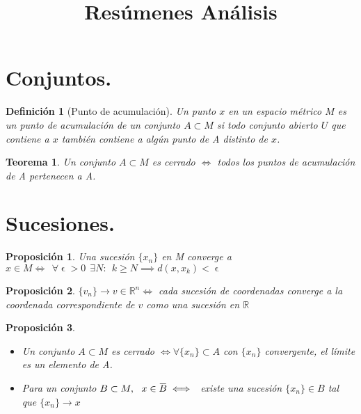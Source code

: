 \documentclass[11pt, a4paper]{article}
\title{\textbf{Resúmenes Análisis}}
\date{}
\let\epsilon\upvarepsilon
\newcommand{\overbar}[1]{\mkern 1.5mu\overline{\mkern-1.5mu#1\mkern-1.5mu}\mkern 1.5mu}
\theoremstyle{theorem-style}
\newtheorem*{nth}{Teorema}
\newtheorem*{nprop}{Proposición}
\theoremstyle{definition-style}
\newtheorem*{ndef}{Definición}
\theoremstyle{remark-style}
\theoremstyle{example-style}
\begin{document}
\maketitle

\section{Conjuntos.}
\begin{ndef}[Punto de acumulación]

Un punto $x$ en un espacio métrico $M$ es un punto de acumulación de un conjunto $A\subset M$ si todo conjunto abierto $U$ que contiene a $x$ también contiene a algún punto de A distinto de $x$.
	
\end{ndef}

\begin{nth}
	Un conjunto $A\subset M$ es cerrado $\iff$ todos los puntos de acumulación de A pertenecen a A.
\end{nth}
\section{Sucesiones.}

\begin{nprop}
	Una sucesión $\{x_n\}$ en M converge a $x \in M \iff \ \ \forall \epsilon > 0 \ \ \exists N : \ \ k \geq N \implies d(x,x_k) < \epsilon$
	
	
\end{nprop}

\begin{nprop}
	$\{v_n\} \to v \in \mathbb{R}^n \iff$ cada sucesión de coordenadas converge a la coordenada correspondiente de $v$ como una sucesión en $\mathbb{R}$
\end{nprop}

\begin{nprop}\hfill\\
	\begin{itemize}
	\item Un conjunto $A\subset M$ es cerrado $\iff \forall \{x_n\} \subset A $ con $\{x_n\}$ convergente, el límite es un elemento de A.
	
	\item Para un conjunto $B \subset M, \ \ x \in \overbar{B} \iff \ $ existe una sucesión $\{x_n\}\in B$ tal que $\{x_n\} \to x$

\end{itemize}
\end{nprop}
\end{document}
